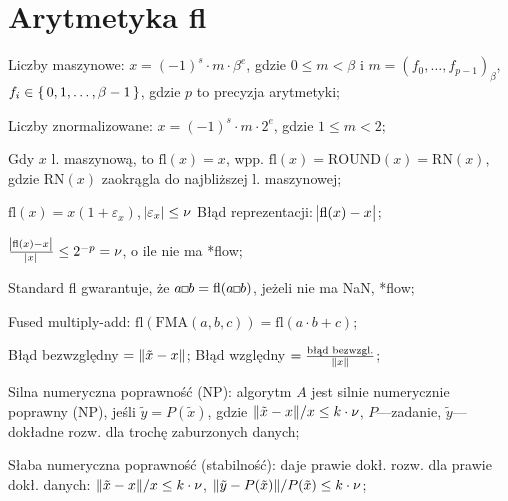 \section{Arytmetyka fl}

\entry
Liczby maszynowe: $x=(-1)^s \cdot m \cdot \beta^e$, gdzie $0\leq m < \beta$ i $m=(f_0, \ldots, f_{p-1})_\beta$, $f_i\in\set{0,1,\ldots,\beta-1}$, gdzie $p$ to precyzja arytmetyki;

\entry
Liczby znormalizowane: $x=(-1)^s\cdot m \cdot 2^e$, gdzie $1\leq m < 2$;

\entry
Gdy $x$ l. maszynową, to $\mathrm{fl}(x)=x$, wpp. $\mathrm{fl}(x)=\mathrm{ROUND}(x)=\mathrm{RN}(x)$, gdzie $\mathrm{RN}(x)$ zaokrągla do najbliższej l. maszynowej;

\entry
$\mathrm{fl}(x) = x(1+\varepsilon_x)$, $\abs{\varepsilon_x}\leq \nu$
\entry
Błąd reprezentacji: $\abs{\mathrm{fl}(x) - x}$;

\entry
$\frac{\abs{\mathrm{fl}(x) - x}}{\abs{x}}\leq 2^{-p}=\nu$, o ile nie ma *flow;

\entry
Standard fl gwarantuje, że $a \Hsquare b = \mathrm{fl}(a\Hsquare b)$, jeżeli nie ma NaN, *flow;

\entry
Fused multiply-add:
$\mathrm{fl}(\mathrm{FMA}(a,b,c)) = \mathrm{fl}(a \cdot b + c)$;


\entry
Błąd bezwzględny $=\|\tilde{x} - x\|$;
\entry
Błąd względny $=\frac{\text{błąd bezwzgl.}}{\|x\|}$;

\entry
Silna numeryczna poprawność (NP): algorytm $A$ jest silnie numerycznie poprawny (NP), jeśli $\tilde{y} = P(\tilde{x})$, gdzie $\|\tilde{x}-x\| / x\leq k\cdot\nu$, $P$---zadanie, $\tilde{y}$---dokładne rozw. dla trochę zaburzonych danych;

\entry
Słaba numeryczna poprawność (stabilność): daje prawie dokł. rozw. dla prawie dokł. danych: $\|\tilde{x}-x\| / x\leq k\cdot\nu$, $\|\tilde{y}-P(\tilde{x})\| / P(\tilde{x})\leq k\cdot\nu$;
